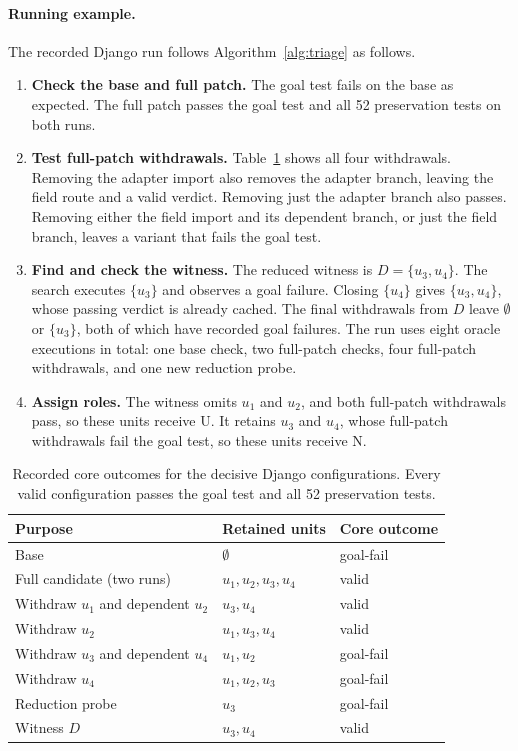 \documentclass[a4paper,fleqn]{cas-sc}
\newcommand{\lab}[1]{\textsf{#1}}
\begin{document}
\paragraph{Running example.} The recorded Django run follows Algorithm~\ref{alg:triage} as follows.
\begin{enumerate}
\item \textbf{Check the base and full patch.} The goal test fails on the base as expected. The full patch passes the goal test and all 52 preservation tests on both runs.
\item \textbf{Test full-patch withdrawals.} Table~\ref{tab:example} shows all four withdrawals. Removing the adapter import also removes the adapter branch, leaving the field route and a valid verdict. Removing just the adapter branch also passes. Removing either the field import and its dependent branch, or just the field branch, leaves a variant that fails the goal test.
\item \textbf{Find and check the witness.} The reduced witness is $D=\{u_3,u_4\}$. The search executes $\{u_3\}$ and observes a goal failure. Closing $\{u_4\}$ gives $\{u_3,u_4\}$, whose passing verdict is already cached. The final withdrawals from $D$ leave $\emptyset$ or $\{u_3\}$, both of which have recorded goal failures. The run uses eight oracle executions in total: one base check, two full-patch checks, four full-patch withdrawals, and one new reduction probe.
\item \textbf{Assign roles.} The witness omits $u_1$ and $u_2$, and both full-patch withdrawals pass, so these units receive \lab{U}. It retains $u_3$ and $u_4$, whose full-patch withdrawals fail the goal test, so these units receive \lab{N}.
\end{enumerate}

\begin{table}[pos=htbp]
\caption{Recorded core outcomes for the decisive Django configurations. Every valid configuration passes the goal test and all 52 preservation tests.}
\label{tab:example}
\centering\small
\begin{tabular}{lll}
\toprule
Purpose & Retained units & Core outcome \\
\midrule
Base & $\emptyset$ & goal-fail \\
Full candidate (two runs) & $u_1,u_2,u_3,u_4$ & valid \\
Withdraw $u_1$ and dependent $u_2$ & $u_3,u_4$ & valid \\
Withdraw $u_2$ & $u_1,u_3,u_4$ & valid \\
Withdraw $u_3$ and dependent $u_4$ & $u_1,u_2$ & goal-fail \\
Withdraw $u_4$ & $u_1,u_2,u_3$ & goal-fail \\
Reduction probe & $u_3$ & goal-fail \\
Witness $D$ & $u_3,u_4$ & valid \\
\bottomrule
\end{tabular}
\end{table}
\end{document}
